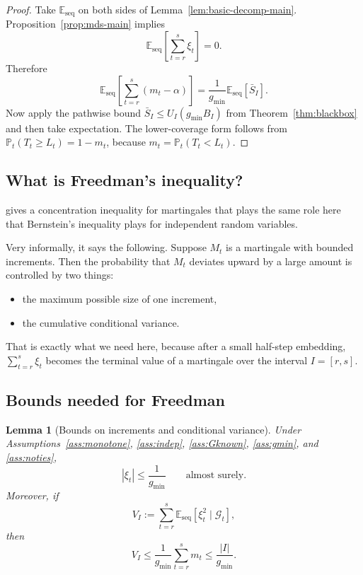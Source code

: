 \documentclass[11pt]{article}
\newtheorem{lemma}{Lemma}
\newcommand{\E}{\mathbb{E}}
\newcommand{\Prob}{\mathbb{P}}
\newcommand{\1}{\mathbf{1}}
\newcommand{\seq}{\mathrm{seq}}
\newcommand{\cG}{\mathcal{G}}
\begin{document}
\begin{proof}
Take $\E_{\seq}$ on both sides of Lemma~\ref{lem:basic-decomp-main}. Proposition~\ref{prop:mds-main} implies
\[
\E_{\seq}\!\left[\sum_{t=r}^s\xi_t\right]=0.
\]
Therefore
\[
\E_{\seq}\!\left[\sum_{t=r}^s(m_t-\alpha)\right]
=
\frac{1}{g_{\min}}\E_{\seq}[\bar S_I].
\]
Now apply the pathwise bound $\bar S_I\le U_I(g_{\min}B_I)$ from Theorem~\ref{thm:blackbox} and then take expectation. The lower-coverage form follows from $\Prob_t(T_t\ge L_t)=1-m_t$, because $m_t=\Prob_t(T_t<L_t)$.
\end{proof}

\subsection{What is Freedman's inequality?}

\citet{Freedman1975} gives a concentration inequality for martingales that plays the same role here that Bernstein's inequality plays for independent random variables.

Very informally, it says the following. Suppose $M_t$ is a martingale with bounded increments. Then the probability that $M_t$ deviates upward by a large amount is controlled by two things:
\begin{itemize}[leftmargin=*,itemsep=2pt]
  \item the maximum possible size of one increment,
  \item the cumulative conditional variance.
\end{itemize}

That is exactly what we need here, because after a small half-step embedding, $\sum_{t=r}^s \xi_t$ becomes the terminal value of a martingale over the interval $I=[r,s]$.

\subsection{Bounds needed for Freedman}

\begin{lemma}[Bounds on increments and conditional variance]
\label{lem:freedman-bounds}
Under Assumptions~\ref{ass:monotone}, \ref{ass:indep}, \ref{ass:Gknown}, \ref{ass:gmin}, and \ref{ass:noties},
\[
|\xi_t|\le \frac{1}{g_{\min}}
\qquad\text{almost surely.}
\]
Moreover, if
\[
V_I:=\sum_{t=r}^s \E_{\seq}[\xi_t^2\mid \cG_t],
\]
then
\[
V_I\le \frac{1}{g_{\min}}\sum_{t=r}^s m_t \le \frac{|I|}{g_{\min}}.
\]
\end{lemma}
\end{document}

